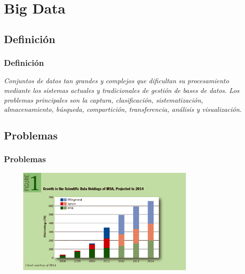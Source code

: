 \documentclass[serif,12pt]{beamer}
\begin{document}
\section{Big Data}

\subsection{Definición}
\begin{frame}
\frametitle{Definición}

\begin{shaded}
\emph{Conjuntos de datos tan grandes y complejos que dificultan su procesamiento mediante los sistemas actuales y tradicionales de gestión de bases de datos. Los problemas principales son la captura, clasificación, sistematización, almacenamiento, búsqueda, compartición, transferencia, análisis y visualización.}
\end{shaded}
\end{frame}
\subsection{Problemas}

\begin{frame}
\frametitle{Problemas}

\begin{figure}
\centering
\includegraphics[width=3.5in]{images/data_rates.png} 
\label{fig:data_rates}
\end{figure}


\end{frame}

\end{document}
